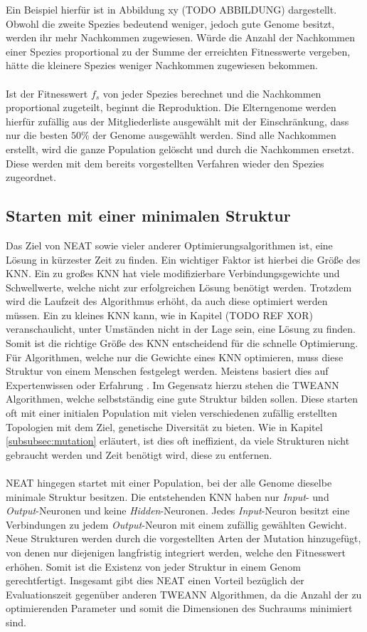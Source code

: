 Ein Beispiel hierfür ist in Abbildung xy (TODO ABBILDUNG) dargestellt. Obwohl die zweite Spezies bedeutend weniger, jedoch gute Genome besitzt, werden ihr mehr Nachkommen zugewiesen. Würde die Anzahl der Nachkommen einer Spezies proportional zu der Summe der erreichten Fitnesswerte vergeben, hätte die kleinere Spezies weniger Nachkommen zugewiesen bekommen. 
\\\\
Ist der Fitnesswert $f_s$ von jeder Spezies berechnet und die Nachkommen proportional zugeteilt, beginnt die Reproduktion. Die Elterngenome werden hierfür zufällig aus der Mitgliederliste ausgewählt mit der Einschränkung, dass nur die besten $50\%$ der Genome ausgewählt werden. Sind alle Nachkommen erstellt, wird die ganze Population gelöscht und durch die Nachkommen ersetzt. Diese werden mit dem bereits vorgestellten Verfahren wieder den Spezies zugeordnet.
\subsection{Starten mit einer minimalen Struktur}
\label{subsec:neat_minimal_structure}
Das Ziel von \ac{NEAT} sowie vieler anderer Optimierungsalgorithmen ist, eine Lösung in kürzester Zeit zu finden. Ein wichtiger Faktor ist hierbei die Größe des \ac{KNN}. Ein zu großes \ac{KNN} hat viele modifizierbare Verbindungsgewichte und Schwellwerte, welche nicht zur erfolgreichen Lösung benötigt werden. Trotzdem wird die Laufzeit des Algorithmus erhöht, da auch diese optimiert werden müssen. Ein zu kleines \ac{KNN} kann, wie in Kapitel (TODO REF XOR) veranschaulicht, unter Umständen nicht in der Lage sein, eine Lösung zu finden. Somit ist die richtige Größe des \ac{KNN} entscheidend für die schnelle Optimierung. Für Algorithmen, welche nur die Gewichte eines \ac{KNN} optimieren, muss diese Struktur von einem Menschen festgelegt werden. Meistens basiert dies auf Expertenwissen oder Erfahrung \cite{stanley2017oreilly}. Im Gegensatz hierzu stehen die \ac{TWEANN} Algorithmen, welche selbstständig eine gute Struktur bilden sollen. Diese starten oft mit einer initialen Population mit vielen verschiedenen zufällig erstellten Topologien mit dem Ziel, genetische Diversität zu bieten. Wie in Kapitel \ref{subsubsec:mutation} erläutert, ist dies oft ineffizient, da viele Strukturen nicht gebraucht werden und Zeit benötigt wird, diese zu entfernen.
\\\\
\ac{NEAT} hingegen startet mit einer Population, bei der alle Genome dieselbe minimale Struktur besitzen. Die entstehenden \ac{KNN} haben nur \emph{Input}- und \emph{Output}-Neuronen und keine \emph{Hidden}-Neuronen. Jedes \emph{Input}-Neuron besitzt eine Verbindungen zu jedem \emph{Output}-Neuron mit einem zufällig gewählten Gewicht. Neue Strukturen werden durch die vorgestellten Arten der Mutation hinzugefügt, von denen nur diejenigen langfristig integriert werden, welche den Fitnesswert erhöhen. Somit ist die Existenz von jeder Struktur in einem Genom gerechtfertigt. Insgesamt gibt dies \ac{NEAT} einen Vorteil bezüglich der Evaluationszeit gegenüber anderen \ac{TWEANN} Algorithmen, da die Anzahl der zu optimierenden Parameter und somit die Dimensionen des Suchraums minimiert sind.